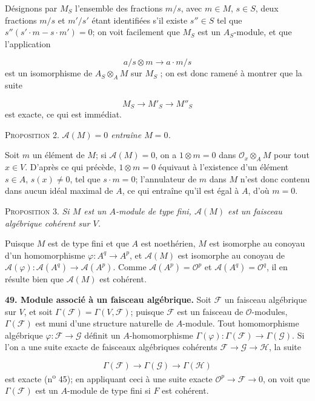 Désignons par $M_S$ l'ensemble des fractions $m/s$, avec $m \in M$, $s \in S$, deux fractions $m/s$ et $m'/s'$ étant identifiées s'il existe $s'' \in S$ tel que $s''(s' \cdot m - s \cdot m') = 0$; on voit facilement que $M_S$ est un $A_S$-module, et que l'application

\begin{equation*}
a/s \otimes m \to a \cdot m/s
\end{equation*}
est un isomorphisme de $A_S \otimes_A M$ sur $M_S$ ; on est donc ramené à montrer que la suite

\begin{equation*}
M_S \to M'_S \to M''_S
\end{equation*}
est exacte, ce qui est immédiat.

\textsc{Proposition} 2. \textit{$\mathcal{A}(M) = 0$ entraîne $M = 0$.}

Soit $m$ un élément de $M$; si $\mathcal{A}(M) = 0$, on a $1 \otimes m = 0$ dans $\mathcal{O}_x \otimes_A M$ pour tout $x \in V$. D'après ce qui précède, $1 \otimes m = 0$ équivaut à l'existence d'un élément $s \in A$, $s(x) \neq 0$, tel que $s \cdot m = 0$; l'annulateur de $m$ dans $M$ n'est donc contenu dans aucun idéal maximal de $A$, ce qui entraîne qu'il est égal à $A$, d'où $m = 0$.

\textsc{Proposition} 3. \textit{Si $M$ est un $A$-module de type fini, $\mathcal{A}(M)$ est un faisceau algébrique cohérent sur $V$.}

Puisque $M$ est de type fini et que $A$ est noethérien, $M$ est isomorphe au conoyau d'un homomorphisme $\varphi : A^q \to A^p$, et $\mathcal{A}(M)$ est isomorphe au conoyau de $\mathcal{A}(\varphi) : \mathcal{A}(A^q) \to \mathcal{A}(A^p)$. Comme $\mathcal{A}(A^p) = \mathcal{O}^p$ et $\mathcal{A}(A^q) = \mathcal{O}^q$, il en résulte bien que $\mathcal{A}(M)$ est cohérent.

\textbf{49. Module associé à un faisceau algébrique.} Soit $\mathcal{F}$ un faisceau algébrique sur $V$, et soit $\Gamma(\mathcal{F}) = \Gamma(V, \mathcal{F})$; puisque $\mathcal{F}$ est un faisceau de $\mathcal{O}$-modules, $\Gamma(\mathcal{F})$ est muni d'une structure naturelle de $A$-module. Tout homomorphisme algébrique $\varphi : \mathcal{F} \to \mathcal{G}$ définit un $A$-homomorphisme $\Gamma(\varphi) : \Gamma(\mathcal{F}) \to \Gamma(\mathcal{G})$. Si l'on a une suite exacte de faisceaux algébriques cohérents $\mathcal{F} \to \mathcal{G} \to \mathcal{H}$, la suite

\begin{equation*}
\Gamma(\mathcal{F}) \to \Gamma(\mathcal{G}) \to \Gamma(\mathcal{H})
\end{equation*}
est exacte (n\textsuperscript{o} 45); en appliquant ceci à une suite exacte $\mathcal{O}^p \to \mathcal{F} \to 0$, on voit que $\Gamma(\mathcal{F})$ est un $A$-module de type fini si $F$ est cohérent.

